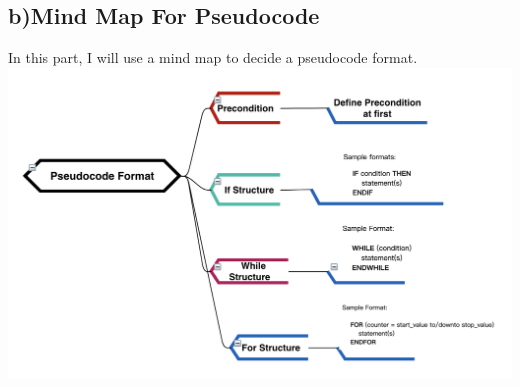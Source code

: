\documentclass[letterpaper, 11pt]{report}
\begin{document}
\subsection*{b)Mind Map For Pseudocode}
In this part, I will use a mind map to decide a pseudocode format.\\

\includegraphics[width= 14cm]{images/mindmap.png}
 \\
 
\end{document}
